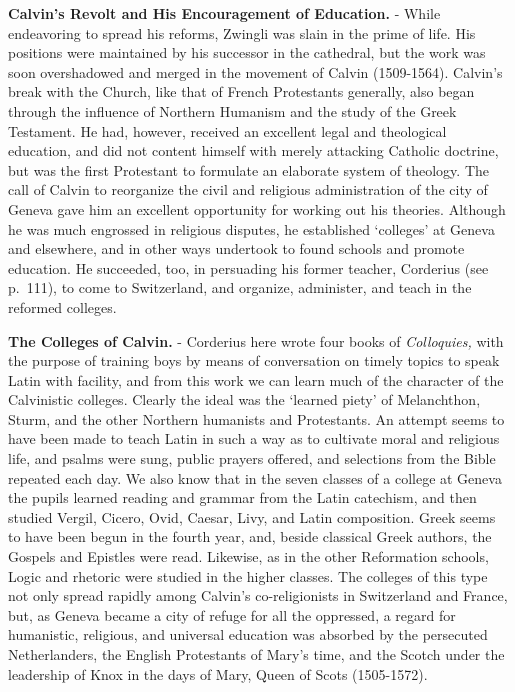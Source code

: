 \documentclass[
]{book}
\begin{document}
\textbf{Calvin's Revolt and His Encouragement of Education.} - While endeavoring to spread his reforms, Zwingli was slain in the prime of life. His positions were maintained by his successor in the cathedral, but the work was soon overshadowed and merged in the movement of Calvin (1509-1564). Calvin's break with the Church, like that of French Protestants generally, also began through the influence of Northern Humanism and the study of the Greek Testament. He had, however, received an excellent legal and theological education, and did not content himself with merely attacking Catholic doctrine, but was the first Protestant to formulate an elaborate system of theology. The call of Calvin to reorganize the civil and religious administration of the city of Geneva gave him an excellent opportunity for working out his theories. Although he was much engrossed in religious disputes, he established `colleges' at Geneva and elsewhere, and in other ways undertook to found schools and promote education. He succeeded, too, in persuading his former teacher, Corderius (see p.~111), to come to Switzerland, and organize, administer, and teach in the reformed colleges.

\textbf{The Colleges of Calvin.} - Corderius here wrote four books of \emph{Colloquies,} with the purpose of training boys by means of conversation on timely topics to speak Latin with facility, and from this work we can learn much of the character of the Calvinistic colleges. Clearly the ideal was the `learned piety' of Melanchthon, Sturm, and the other Northern humanists and Protestants. An attempt seems to have been made to teach Latin in such a way as to cultivate moral and religious life, and psalms were sung, public prayers offered, and selections from the Bible repeated each day. We also know that in the seven classes of a college at Geneva the pupils learned reading and grammar from the Latin catechism, and then studied Vergil, Cicero, Ovid, Caesar, Livy, and Latin composition. Greek seems to have been begun in the fourth year, and, beside classical Greek authors, the Gospels and Epistles were read. Likewise, as in the other Reformation schools, Logic and rhetoric were studied in the higher classes. The colleges of this type not only spread rapidly among Calvin's co-religionists in Switzerland and France, but, as Geneva became a city of refuge for all the oppressed, a regard for humanistic, religious, and universal education was absorbed by the persecuted Netherlanders, the English Protestants of Mary's time, and the Scotch under the leadership of Knox in the days of Mary, Queen of Scots (1505-1572).
\end{document}
